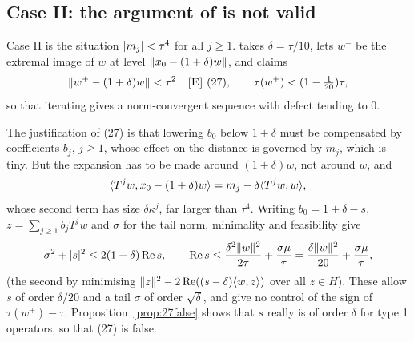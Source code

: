\subsection*{Case II: the argument of \paper{} is not valid}
Case II is the situation $\lvert m_j\rvert<\tau^4$ for all $j\ge1$. \paper{} takes $\delta=\tau/10$,
lets $w^+$ be the extremal image of $w$ at level $\lVert x_0-(1+\delta)w\rVert$, and claims
\begin{equation}\label{eq:claim27}
\lVert w^+-(1+\delta)w\rVert<\tau^2\quad\text{\textnormal{\textsc{[E]}}{} (27)},\qquad\tau(w^+)<(1-\tfrac1{20})\tau ,
\end{equation}
so that iterating gives a norm-convergent sequence with defect tending to $0$.

\begin{remark}\label{rem:caseIIerror}
The justification of (27) is that lowering $b_0$ below $1+\delta$ must be compensated by
coefficients $b_j$, $j\ge1$, whose effect on the distance is governed by $m_j$, which is tiny.
But the expansion has to be made around $(1+\delta)w$, not around $w$, and
\[
\langle T^jw,x_0-(1+\delta)w\rangle=m_j-\delta\langle T^jw,w\rangle,
\]
whose second term has size $\delta\kappa^j$, far larger than $\tau^4$. Writing
$b_0=1+\delta-s$, $z=\sum_{j\ge1}b_jT^jw$ and $\sigma$ for the tail norm, minimality and
feasibility give
\[
\sigma^2+\lvert s\rvert^2\le2(1+\delta)\operatorname{Re} s,\qquad
\operatorname{Re} s\le\frac{\delta^2\lVert w\rVert^2}{2\tau}+\frac{\sigma\mu}{\tau}
=\frac{\delta\lVert w\rVert^2}{20}+\frac{\sigma\mu}{\tau},
\]
(the second by minimising $\lVert z\rVert^2-2\operatorname{Re}((s-\delta)\langle w,z\rangle)$ over all $z\in H$). These allow
$s$ of order $\delta/20$ and a tail $\sigma$ of order $\sqrt\delta$, and give no control of the
sign of $\tau(w^+)-\tau$. Proposition~\ref{prop:27false} shows that $s$ really is of order
$\delta$ for type 1 operators, so that (27) is false.
\end{remark}

